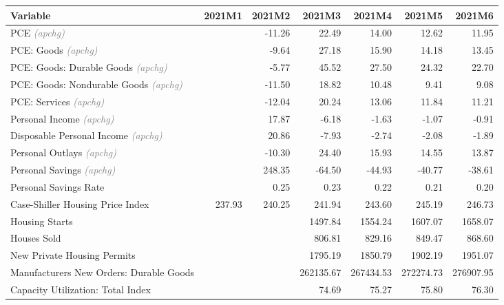 \documentclass[11pt, letterpaper]{article}\usepackage[]{graphicx}\usepackage[]{color}
\begin{document}
\begin{table}[H]
\centering
\begingroup\fontsize{10pt}{12pt}\selectfont
\begin{tabular}{lrrrrrr}
  \hline
Variable & 2021M1 & 2021M2 & 2021M3 & 2021M4 & 2021M5 & 2021M6 \\ 
  \hline
PCE \textit{\footnotesize\textcolor{gray}{(apchg)}} &  & -11.26 & 22.49 & 14.00 & 12.62 & 11.95 \\ 
  PCE: Goods \textit{\footnotesize\textcolor{gray}{(apchg)}} &  & -9.64 & 27.18 & 15.90 & 14.18 & 13.45 \\ 
  PCE: Goods: Durable Goods \textit{\footnotesize\textcolor{gray}{(apchg)}} &  & -5.77 & 45.52 & 27.50 & 24.32 & 22.70 \\ 
  PCE: Goods: Nondurable Goods \textit{\footnotesize\textcolor{gray}{(apchg)}} &  & -11.50 & 18.82 & 10.48 & 9.41 & 9.08 \\ 
  PCE: Services \textit{\footnotesize\textcolor{gray}{(apchg)}} &  & -12.04 & 20.24 & 13.06 & 11.84 & 11.21 \\ 
  Personal Income \textit{\footnotesize\textcolor{gray}{(apchg)}} &  & 17.87 & -6.18 & -1.63 & -1.07 & -0.91 \\ 
  Disposable Personal Income \textit{\footnotesize\textcolor{gray}{(apchg)}} &  & 20.86 & -7.93 & -2.74 & -2.08 & -1.89 \\ 
  Personal Outlays \textit{\footnotesize\textcolor{gray}{(apchg)}} &  & -10.30 & 24.40 & 15.93 & 14.55 & 13.87 \\ 
  Personal Savings \textit{\footnotesize\textcolor{gray}{(apchg)}} &  & 248.35 & -64.50 & -44.93 & -40.77 & -38.61 \\ 
  Personal Savings Rate &  & 0.25 & 0.23 & 0.22 & 0.21 & 0.20 \\ 
  Case-Shiller Housing Price Index & 237.93 & 240.25 & 241.94 & 243.60 & 245.19 & 246.73 \\ 
  Housing Starts &  &  & 1497.84 & 1554.24 & 1607.07 & 1658.07 \\ 
  Houses Sold &  &  & 806.81 & 829.16 & 849.47 & 868.60 \\ 
  New Private Housing Permits &  &  & 1795.19 & 1850.79 & 1902.19 & 1951.07 \\ 
  Manufacturers New Orders: Durable Goods &  &  & 262135.67 & 267434.53 & 272274.73 & 276907.95 \\ 
  Capacity Utilization: Total Index &  &  & 74.69 & 75.27 & 75.80 & 76.30 \\ 

\end{tabular}
\end{table}
\end{document}
